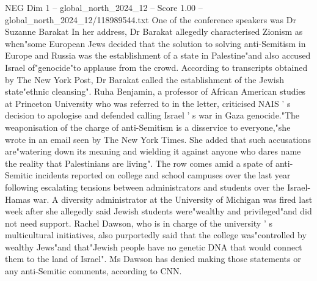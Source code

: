 \begin{textsample}{NEG Dim 1 – global\_north\_2024\_12 – Score 1.00 – global\_north\_2024\_12/118989544.txt}
One of the conference speakers was Dr Suzanne Barakat In her address, Dr Barakat allegedly characterised Zionism as when"some European Jews decided that the solution to solving anti-Semitism in Europe and Russia was the establishment of a state in Palestine"and also accused Israel of"genocide"to applause from the crowd.
According to transcripts obtained by The New York Post, Dr Barakat called the establishment of the Jewish state"ethnic cleansing".
Ruha Benjamin, a professor of African American studies at Princeton University who was referred to in the letter, criticised NAIS ' s decision to apologise and defended calling Israel ' s war in Gaza genocide."The weaponisation of the charge of anti-Semitism is a disservice to everyone,"she wrote in an email seen by The New York Times.
She added that such accusations are"watering down its meaning and wielding it against anyone who dares name the reality that Palestinians are living".
The row comes amid a spate of anti-Semitic incidents reported on college and school campuses over the last year following escalating tensions between administrators and students over the Israel-Hamas war.
A diversity administrator at the University of Michigan was fired last week after she allegedly said Jewish students were"wealthy and privileged"and did not need support.
Rachel Dawson, who is in charge of the university ' s multicultural initiatives, also purportedly said that the college was"controlled by wealthy Jews"and that"Jewish people have no genetic DNA that would connect them to the land of Israel".
Ms Dawson has denied making those statements or any anti-Semitic comments, according to CNN.

\end{textsample}

